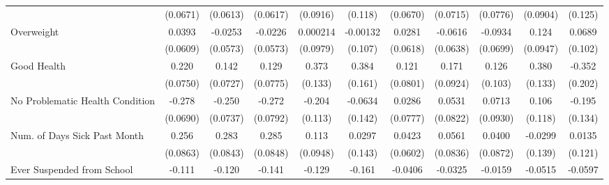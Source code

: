 {\begin{tabular}{l*{10}{c}}
            &    (0.0671)         &    (0.0613)         &    (0.0617)         &    (0.0916)         &     (0.118)         &    (0.0670)         &    (0.0715)         &    (0.0776)         &    (0.0904)         &     (0.125)         \\
\addlinespace
Overweight  &      0.0393         &     -0.0253         &     -0.0226         &    0.000214         &    -0.00132         &      0.0281         &     -0.0616         &     -0.0934         &       0.124         &      0.0689         \\
            &    (0.0609)         &    (0.0573)         &    (0.0573)         &    (0.0979)         &     (0.107)         &    (0.0618)         &    (0.0638)         &    (0.0699)         &    (0.0947)         &     (0.102)         \\
\addlinespace
Good Health &       0.220\sym{**} &       0.142         &       0.129         &       0.373\sym{**} &       0.384\sym{*}  &       0.121         &       0.171         &       0.126         &       0.380\sym{**} &      -0.352         \\
            &    (0.0750)         &    (0.0727)         &    (0.0775)         &     (0.133)         &     (0.161)         &    (0.0801)         &    (0.0924)         &     (0.103)         &     (0.133)         &     (0.202)         \\
\addlinespace
No Problematic Health Condition&      -0.278\sym{***}&      -0.250\sym{***}&      -0.272\sym{***}&      -0.204         &     -0.0634         &      0.0286         &      0.0531         &      0.0713         &       0.106         &      -0.195         \\
            &    (0.0690)         &    (0.0737)         &    (0.0792)         &     (0.113)         &     (0.142)         &    (0.0777)         &    (0.0822)         &    (0.0930)         &     (0.118)         &     (0.134)         \\
\addlinespace
Num. of Days Sick Past Month&       0.256\sym{**} &       0.283\sym{***}&       0.285\sym{***}&       0.113         &      0.0297         &      0.0423         &      0.0561         &      0.0400         &     -0.0299         &      0.0135         \\
            &    (0.0863)         &    (0.0843)         &    (0.0848)         &    (0.0948)         &     (0.143)         &    (0.0602)         &    (0.0836)         &    (0.0872)         &     (0.139)         &     (0.121)         \\
\addlinespace
Ever Suspended from School&      -0.111\sym{*}  &      -0.120\sym{*}  &      -0.141\sym{**} &      -0.129\sym{*}  &      -0.161         &     -0.0406         &     -0.0325         &     -0.0159         &     -0.0515         &     -0.0597         \\

\end{tabular}}
